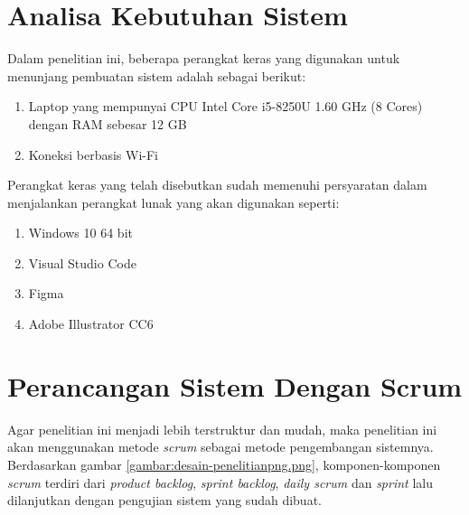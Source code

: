 \section {Analisa Kebutuhan Sistem}

Dalam penelitian ini, beberapa perangkat keras yang digunakan untuk menunjang pembuatan sistem adalah sebagai berikut:

\begin{enumerate}
	\item Laptop yang mempunyai CPU Intel Core i5-8250U 1.60 GHz (8 Cores) dengan RAM sebesar 12 GB
	\item Koneksi berbasis Wi-Fi
\end{enumerate}

Perangkat keras yang telah disebutkan sudah memenuhi persyaratan dalam menjalankan perangkat lunak yang akan digunakan seperti:

\begin{enumerate}
	\item Windows 10 64 bit
	\item Visual Studio Code
	\item Figma
	\item Adobe Illustrator CC6
\end{enumerate}

\section {Perancangan Sistem Dengan Scrum}


%


Agar penelitian ini menjadi lebih terstruktur dan mudah, maka penelitian ini akan menggunakan metode \textit{scrum} sebagai metode pengembangan sistemnya. Berdasarkan gambar \ref{gambar:desain-penelitianpng.png}, komponen-komponen \textit{scrum} terdiri dari \textit{product backlog}, \textit{sprint backlog}, \textit{daily scrum} dan \textit{sprint} lalu dilanjutkan dengan pengujian sistem yang sudah dibuat.


